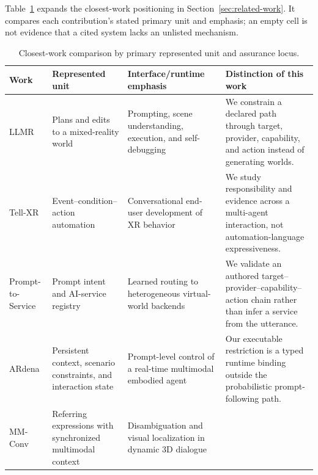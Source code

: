 Table~\ref{tab:closest-work} expands the closest-work positioning in
Section~\ref{sec:related-work}. It compares each contribution's stated primary
unit and emphasis; an empty cell is not evidence that a cited system lacks an
unlisted mechanism.

\begin{table}[!htbp]
  \caption{Closest-work comparison by primary represented unit and assurance
  locus.}
  \label{tab:closest-work}
  \small
  \setlength{\tabcolsep}{4pt}
  \begin{tabular}{@{}p{}p{}p{}p{}@{}}
    \toprule
    Work & Represented unit & Interface/runtime emphasis &
    Distinction of this work \\
    \midrule
    LLMR \cite{delatorre2024llmr} &
    Plans and edits to a mixed-reality world &
    Prompting, scene understanding, execution, and self-debugging &
    We constrain a declared path through target, provider, capability, and
    action instead of generating worlds. \\
    Tell-XR \cite{carcangiu2025tellxr} &
    Event--condition--action automation &
    Conversational end-user development of XR behavior &
    We study responsibility and evidence across a multi-agent interaction, not
    automation-language expressiveness. \\
    Prompt-to-Service \cite{nisiotis2026prompt} &
    Prompt intent and AI-service registry &
    Learned routing to heterogeneous virtual-world backends &
    We validate an authored target--provider--capability--action chain rather
    than infer a service from the utterance. \\
    ARdena \cite{borozan2026ardena} &
    Persistent context, scenario constraints, and interaction state &
    Prompt-level control of a real-time multimodal embodied agent &
    Our executable restriction is a typed runtime binding outside the
    probabilistic prompt-following path. \\
    MM-Conv \cite{deichler2026mmconv} &
    Referring expressions with synchronized multimodal context &
    Disambiguation and visual localization in dynamic 3D dialogue &

\end{tabular}
\end{table}
